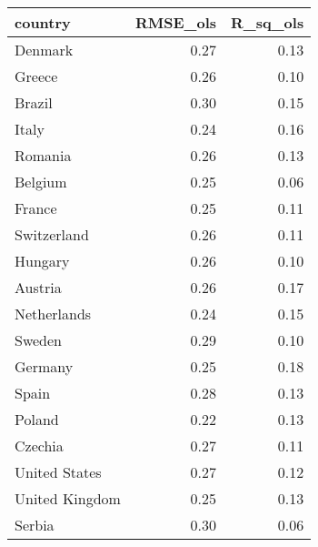 \begin{table}[ht]
\centering
\begin{tabular}{lrr}
  \hline
country & RMSE\_ols & R\_sq\_ols \\ 
  \hline
Denmark & 0.27 & 0.13 \\ 
  Greece & 0.26 & 0.10 \\ 
  Brazil & 0.30 & 0.15 \\ 
  Italy & 0.24 & 0.16 \\ 
  Romania & 0.26 & 0.13 \\ 
  Belgium & 0.25 & 0.06 \\ 
  France & 0.25 & 0.11 \\ 
  Switzerland & 0.26 & 0.11 \\ 
  Hungary & 0.26 & 0.10 \\ 
  Austria & 0.26 & 0.17 \\ 
  Netherlands & 0.24 & 0.15 \\ 
  Sweden & 0.29 & 0.10 \\ 
  Germany & 0.25 & 0.18 \\ 
  Spain & 0.28 & 0.13 \\ 
  Poland & 0.22 & 0.13 \\ 
  Czechia & 0.27 & 0.11 \\ 
  United States & 0.27 & 0.12 \\ 
  United Kingdom & 0.25 & 0.13 \\ 
  Serbia & 0.30 & 0.06 \\ 
   \hline
\end{tabular}
\end{table}
